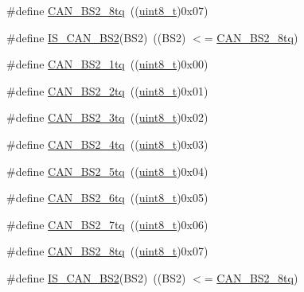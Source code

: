\begin{DoxyCompactItemize}
\item 
\#define \hyperlink{group___c_a_n__time__quantum__in__bit__segment__2_gaad8dcbb266cf5074bfb67bd7108597c6}{C\+A\+N\+\_\+\+B\+S2\+\_\+8tq}~((\hyperlink{_p_e___types_8h_aba7bc1797add20fe3efdf37ced1182c5}{uint8\+\_\+t})0x07)
\item 
\#define \hyperlink{group___c_a_n__time__quantum__in__bit__segment__2_ga3f5620b1d094dbd7d2fb8d16f4b187a9}{I\+S\+\_\+\+C\+A\+N\+\_\+\+B\+S2}(B\+S2)~((B\+S2) $<$= \hyperlink{openmotestm_2library_2inc_2stm32f10x__can_8h_aad8dcbb266cf5074bfb67bd7108597c6}{C\+A\+N\+\_\+\+B\+S2\+\_\+8tq})
\item 
\#define \hyperlink{group___c_a_n__time__quantum__in__bit__segment__2_gad9af25a3f61df7b09b8d6a5e81d8027e}{C\+A\+N\+\_\+\+B\+S2\+\_\+1tq}~((\hyperlink{_p_e___types_8h_aba7bc1797add20fe3efdf37ced1182c5}{uint8\+\_\+t})0x00)
\item 
\#define \hyperlink{group___c_a_n__time__quantum__in__bit__segment__2_gac43d82f74990620499f1998187ff3602}{C\+A\+N\+\_\+\+B\+S2\+\_\+2tq}~((\hyperlink{_p_e___types_8h_aba7bc1797add20fe3efdf37ced1182c5}{uint8\+\_\+t})0x01)
\item 
\#define \hyperlink{group___c_a_n__time__quantum__in__bit__segment__2_gab3d325ce4a5d0eb1ee8ee50ad4ec7e49}{C\+A\+N\+\_\+\+B\+S2\+\_\+3tq}~((\hyperlink{_p_e___types_8h_aba7bc1797add20fe3efdf37ced1182c5}{uint8\+\_\+t})0x02)
\item 
\#define \hyperlink{group___c_a_n__time__quantum__in__bit__segment__2_gaaff1c1cdd809f185299971c6437f32a0}{C\+A\+N\+\_\+\+B\+S2\+\_\+4tq}~((\hyperlink{_p_e___types_8h_aba7bc1797add20fe3efdf37ced1182c5}{uint8\+\_\+t})0x03)
\item 
\#define \hyperlink{group___c_a_n__time__quantum__in__bit__segment__2_ga89feba32bcc2e909f858d535edaad101}{C\+A\+N\+\_\+\+B\+S2\+\_\+5tq}~((\hyperlink{_p_e___types_8h_aba7bc1797add20fe3efdf37ced1182c5}{uint8\+\_\+t})0x04)
\item 
\#define \hyperlink{group___c_a_n__time__quantum__in__bit__segment__2_ga72c3245b794d3238763d1ec319bf386f}{C\+A\+N\+\_\+\+B\+S2\+\_\+6tq}~((\hyperlink{_p_e___types_8h_aba7bc1797add20fe3efdf37ced1182c5}{uint8\+\_\+t})0x05)
\item 
\#define \hyperlink{group___c_a_n__time__quantum__in__bit__segment__2_ga8005adaef02fb90e400909de08dec031}{C\+A\+N\+\_\+\+B\+S2\+\_\+7tq}~((\hyperlink{_p_e___types_8h_aba7bc1797add20fe3efdf37ced1182c5}{uint8\+\_\+t})0x06)
\item 
\#define \hyperlink{group___c_a_n__time__quantum__in__bit__segment__2_gaad8dcbb266cf5074bfb67bd7108597c6}{C\+A\+N\+\_\+\+B\+S2\+\_\+8tq}~((\hyperlink{_p_e___types_8h_aba7bc1797add20fe3efdf37ced1182c5}{uint8\+\_\+t})0x07)
\item 
\#define \hyperlink{group___c_a_n__time__quantum__in__bit__segment__2_ga3f5620b1d094dbd7d2fb8d16f4b187a9}{I\+S\+\_\+\+C\+A\+N\+\_\+\+B\+S2}(B\+S2)~((B\+S2) $<$= \hyperlink{openmotestm_2library_2inc_2stm32f10x__can_8h_aad8dcbb266cf5074bfb67bd7108597c6}{C\+A\+N\+\_\+\+B\+S2\+\_\+8tq})
\end{DoxyCompactItemize}


